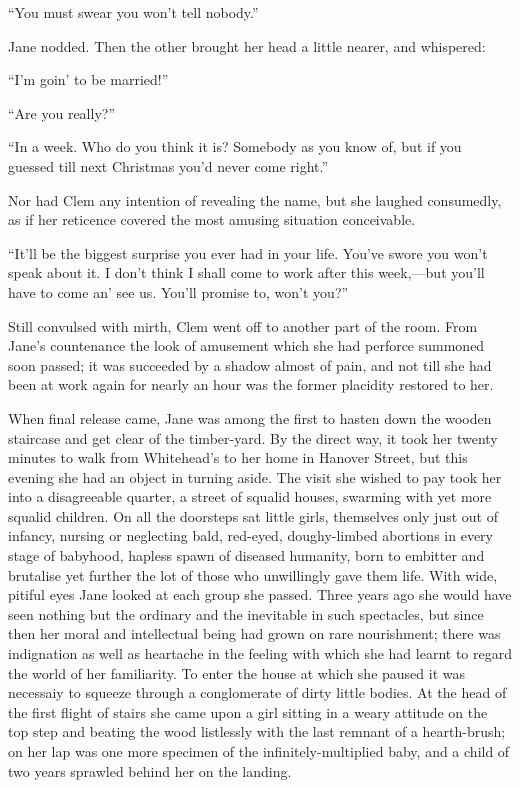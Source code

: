``You must swear you won't tell nobody.''

{\protect\hypertarget{24}{}{}}Jane nodded. Then the other brought her
head a little nearer, and whispered:

``I'm goin' to be married!''

``Are you really?''

``In a week. Who do you think it is? Somebody as you know of, but if you
guessed till next Christmas you'd never come right.''

Nor had Clem any intention of revealing the name, but she laughed
consumedly, as if her reticence covered the most amusing situation
conceivable.

``It'll be the biggest surprise you ever had in your life. You've swore
you won't speak about it. I don't think I shall come to work after this
week,---but you'll have to come an' see us. You'll promise to, won't
you?''

Still convulsed with mirth, Clem went off to another part of the room.
From Jane's countenance the look of amusement which she had perforce
summoned soon passed; it was succeeded by a shadow almost of pain, and
not till she had been at work again for nearly an hour was the former
placidity restored to her.

{\protect\hypertarget{25}{}{}}When final release came, Jane was among
the first to hasten down the wooden staircase and get clear of the
timber-yard. By the direct way, it took her twenty minutes to walk from
Whitehead's to her home in Hanover Street, but this evening she had an
object in turning aside. The visit she wished to pay took her into a
disagreeable quarter, a street of squalid houses, swarming with yet more
squalid children. On all the doorsteps sat little girls, themselves only
just out of infancy, nursing or neglecting bald, red-eyed, doughy-limbed
abortions in every stage of babyhood, hapless spawn of diseased
humanity, born to embitter and brutalise yet further the lot of those
who unwillingly gave them life. With wide, pitiful eyes Jane looked at
each group she passed. Three years ago she would have seen nothing but
the ordinary and the inevitable in such spectacles, but since then her
moral and intellectual being had grown on rare nourishment; there was
indignation as well as heartache in the feeling with which she had
learnt to regard the {\protect\hypertarget{26}{}{}}world of her
familiarity. To enter the house at which she paused it was necessaiy to
squeeze through a conglomerate of dirty little bodies. At the head of
the first flight of stairs she came upon a girl sitting in a weary
attitude on the top step and beating the wood listlessly with the last
remnant of a hearth-brush; on her lap was one more specimen of the
infinitely-multiplied baby, and a child of two years sprawled behind her
on the landing.

